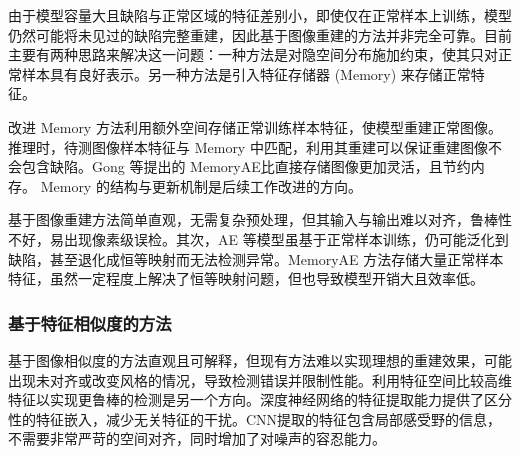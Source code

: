 由于模型容量大且缺陷与正常区域的特征差别小，即使仅在正常样本上训练，模型仍然可能将未见过的缺陷完整重建，因此基于图像重建的方法并非完全可靠。目前主要有两种思路来解决这一问题：一种方法是对隐空间分布施加约束，使其只对正常样本具有良好表示。另一种方法是引入特征存储器 (Memory) 来存储正常特征。

改进 Memory 方法利用额外空间存储正常训练样本特征，使模型重建正常图像。推理时，待测图像样本特征与 Memory 中匹配，利用其重建可以保证重建图像不会包含缺陷。Gong 等\cite{gongMemorizingNormalityDetect2019}提出的 MemoryAE比直接存储图像更加灵活，且节约内存。 Memory 的结构与更新机制是后续工作改进的方向。

基于图像重建方法简单直观，无需复杂预处理，但其输入与输出难以对齐，鲁棒性不好，易出现像素级误检。其次，AE 等模型虽基于正常样本训练，仍可能泛化到缺陷，甚至退化成恒等映射而无法检测异常。MemoryAE 方法存储大量正常样本特征，虽然一定程度上解决了恒等映射问题，但也导致模型开销大且效率低。


\subsubsection{基于特征相似度的方法}

基于图像相似度的方法直观且可解释，但现有方法难以实现理想的重建效果，可能出现未对齐或改变风格的情况，导致检测错误并限制性能。利用特征空间比较高维特征以实现更鲁棒的检测是另一个方向。深度神经网络的特征提取能力提供了区分性的特征嵌入，减少无关特征的干扰。CNN提取的特征包含局部感受野的信息，不需要非常严苛的空间对齐，同时增加了对噪声的容忍能力。



